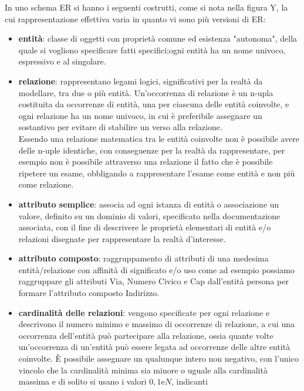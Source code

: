 \documentclass[a4paper,12pt, oneside]{book}
\begin{document}
In uno schema ER si hanno i seguenti costrutti, come si nota nella figura Y,
la cui rappresentazione effettiva varia in quanto vi sono più versioni di ER:
\begin{itemize}
	\item \textbf{entità}: classe di oggetti con proprietà comune ed esistenza "autonoma", della quale si vogliono specificare
	      fatti specifici;ogni entità ha un nome univoco, espressivo e al singolare.
	\item \textbf{relazione}: rappresentano legami logici, significativi per la realtà da modellare, tra due o più entità.\newline
	      Un'occorrenza di relazione è un n-upla costituita da occorrenze di entità, una per ciascuna delle entità coinvolte,
	      e ogni relazione ha un nome univoco, in cui è preferibile assegnare un sostantivo per evitare di stabilire un verso alla relazione.\\
	      Essendo una relazione matematica tra le entità coinvolte non è possibile avere delle n-uple identiche, con conseguenze
	      per la realtà da rappresentare, per esempio non è possibile attraverso una relazione il fatto che è possibile
	      ripetere un esame, obbligando a rappresentare l'esame come entità e non più come relazione.
	\item \textbf{attributo semplice}: associa ad ogni istanza di entità o associazione un valore, definito su un dominio di valori,
	      specificato nella documentazione associata, con il fine di descrivere le proprietà elementari
	      di entità e/o relazioni disegnate per rappresentare la realtà d'interesse.\newline
	\item \textbf{attributo composto}: raggruppamento di attributi di una medesima entità/relazione con affinità di significato e/o uso
	      come ad esempio possiamo raggruppare gli attributi Via, Numero Civico e Cap dall'entità persona per formare
	      l'attributo composto Indirizzo.
	\item \textbf{cardinalità delle relazioni}: vengono specificate per ogni relazione e descrivono il numero minimo e massimo di occorrenze
	      di relazione, a cui una occorrenza dell'entità può partecipare alla relazione, ossia quante volte un'occorrenza
	      di un'entità può essere legata ad occorrenze delle altre entità coinvolte.\newline
	      È possibile assegnare un qualunque intero non negativo, con l'unico vincolo che la cardinalità minima
	      sia minore o uguale alla cardinalità massima e di solito si usano i valori $0, 1 \text{e} N$, indicanti

\end{itemize}
\end{document}
